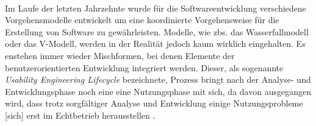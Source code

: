 \\
Im Laufe der letzten Jahrzehnte wurde für die Softwareentwicklung verschiedene Vorgehensmodelle entwickelt um eine koordinierte Vorgehensweise für die Erstellung von Software zu gewährleisten. Modelle, wie zbs. das Wasserfallmodell oder das V-Modell, werden in der Realität jedoch kaum wirklich eingehalten. Es enstehen immer wieder Mischformen, bei denen Elemente der benutzerorientierten Entwicklung integriert werden. Dieser, als sogenannte \textit{Usability Engineering Lifecycle} bezeichnete, Prozess bringt nach der Analyse- und Entwicklungsphase noch eine eine Nutzungsphase mit sich, da davon ausgegangen wird, dass \glqq trotz sorgfältiger Analyse und Entwicklung einige Nutzungsprobleme [sich] erst im Echtbetrieb herausstellen\grqq{} \cite{lifecycle}.





